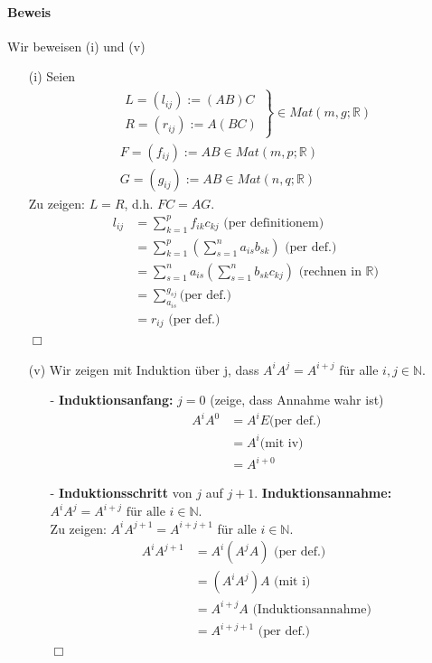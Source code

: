 \documentclass[11pt]{report}
\newcommand*\Zb[1] {\mathbb{#1}}
\newcommand*\f[1] {\textbf{#1}}
\begin{document}
\paragraph{Beweis} Wir beweisen (i) und (v)
\begin{itemize}
 \item[(i)] Seien 
\begin{align}
\left. \begin{array}{cl} L = (l_{ij}) := (AB)C  \\
R = (r_{ij}) := A(BC) \end{array} \right\} \in Mat(m, g; \Zb{R}) \\
F = (f_{ij}) := AB \in Mat(m, p; \Zb{R}) \\
G = (g_{ij}) := AB \in Mat(n, q; \Zb{R}) 
\end{align}
Zu zeigen: $L = R$, d.h. $FC = AG$.
\begin{align}
 l_{ij} &= \sum_{k=1}^{p} f_{ik} c_{kj} \text{ (per definitionem)}\\
        &= \sum_{k=1}^{p} \left( \sum_{s=1}^{n} a_{is} b_{sk} \right) \text{ (per def.)}\\
        &= \sum_{s=1}^{n} a_{is} \left( \sum_{s=1}^{n} b_{sk} c_{kj} \right) \text{ (rechnen in }\Zb{R}\text{)}\\
        &= \sum_{a_{is}}^{g_{sj}} \text{(per def.)}\\
        &= r_{ij} \text{ (per def.)   } 
\end{align}\hfill $\Box$

 \item[(v)] Wir zeigen mit Induktion über j, dass $A^i A^j = A^{i+j}$ für alle $i,j \in \Zb{N}$.
\begin{itemize}
 \item[-] \f{Induktionsanfang:} $j=0$ (zeige, dass Annahme wahr ist)
\begin{align}
A^i A^0 &= A^i E \text{(per def.)} \\
        &= A^i \text{(mit iv)} \\
        &= A^{i+0}
\end{align}
\item[-] \f{Induktionsschritt} von $j$ auf $j+1$. \f{Induktionsannahme:} $A^i A^j = A^{i+j}\text{ für alle } i \in \Zb{N}$.\\
Zu zeigen: $A^i  A^{j+1} = A^{i+j+1}$ für alle $i \in \Zb{N}$.
\begin{align}
 A^i A^{j+1} &= A^i(A^j A) \text{ (per def.)} \\
         &= (A^i A^j)A \text{ (mit i)}\\
         &= A^{i+j} A\text{ (Induktionsannahme)}\\
         &= A^{i+j+1} \text{ (per def.)  }
\end{align} \hfill $\Box$
\end{itemize}
\end{itemize}
\end{document}
